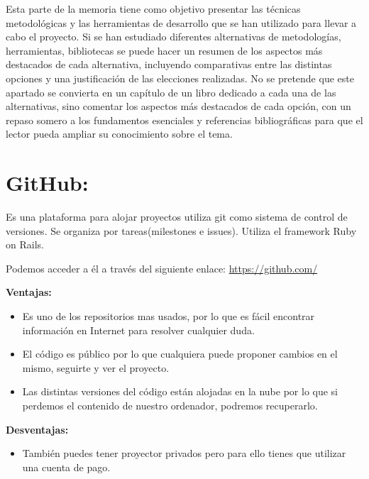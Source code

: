 
Esta parte de la memoria tiene como objetivo presentar las técnicas metodológicas y las herramientas de desarrollo que se han utilizado para llevar a cabo el proyecto. Si se han estudiado diferentes alternativas de metodologías, herramientas, bibliotecas se puede hacer un resumen de los aspectos más destacados de cada alternativa, incluyendo comparativas entre las distintas opciones y una justificación de las elecciones realizadas. 
No se pretende que este apartado se convierta en un capítulo de un libro dedicado a cada una de las alternativas, sino comentar los aspectos más destacados de cada opción, con un repaso somero a los fundamentos esenciales y referencias bibliográficas para que el lector pueda ampliar su conocimiento sobre el tema.


\section{GitHub:}
Es una plataforma para alojar proyectos utiliza git como sistema de control de versiones. Se organiza por tareas(milestones e issues).
Utiliza el framework Ruby on Rails\cite{github}.

Podemos acceder a él a través del siguiente enlace: 
\url{https://github.com/}

\textbf{Ventajas:}

\begin{itemize}
\item Es uno de los repositorios mas usados, por lo que es fácil encontrar información en Internet para resolver cualquier duda.

\item El código es público por lo que cualquiera puede proponer cambios en el mismo, seguirte y ver el proyecto.

\item Las distintas versiones del código están alojadas en la nube por lo que si perdemos el contenido de nuestro ordenador, podremos recuperarlo.
\end{itemize}

\textbf{Desventajas:}

\begin{itemize}
\item También puedes tener proyector privados pero para ello tienes que utilizar una cuenta de pago.
\end{itemize}


